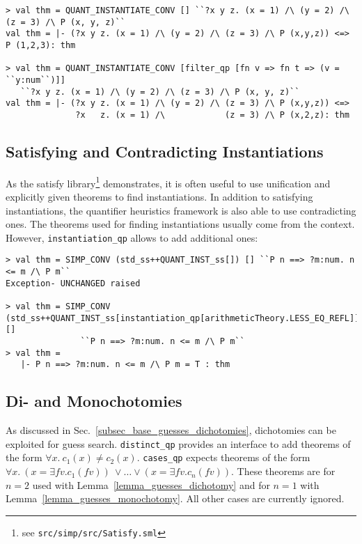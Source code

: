 \documentclass[a4paper,12pt,DIV=12,oneside]{scrbook}
\newcommand{\fv}{\textit{fv}}
\theoremstyle{definition}
\theoremstyle{remark}
\begin{document}
{\scriptsize
\begin{verbatim}
> val thm = QUANT_INSTANTIATE_CONV [] ``?x y z. (x = 1) /\ (y = 2) /\ (z = 3) /\ P (x, y, z)``
val thm = |- (?x y z. (x = 1) /\ (y = 2) /\ (z = 3) /\ P (x,y,z)) <=> P (1,2,3): thm

> val thm = QUANT_INSTANTIATE_CONV [filter_qp [fn v => fn t => (v = ``y:num``)]]
   ``?x y z. (x = 1) /\ (y = 2) /\ (z = 3) /\ P (x, y, z)``
val thm = |- (?x y z. (x = 1) /\ (y = 2) /\ (z = 3) /\ P (x,y,z)) <=>
              ?x   z. (x = 1) /\            (z = 3) /\ P (x,2,z): thm
\end{verbatim}}

\subsection{Satisfying and Contradicting Instantiations}

As the satisfy library\footnote{see \texttt{src/simp/src/Satisfy.sml}} demonstrates, it is often
useful to use unification and explicitly given theorems to
find instantiations. In addition to satisfying instantiations, the quantifier heuristics framework
is also able to use contradicting ones. The theorems used for finding instantiations usually come from
the context. However, \texttt{instantiation\_qp} allows to add additional ones:

{\scriptsize
\begin{verbatim}
> val thm = SIMP_CONV (std_ss++QUANT_INST_ss[]) [] ``P n ==> ?m:num. n <= m /\ P m``
Exception- UNCHANGED raised

> val thm = SIMP_CONV (std_ss++QUANT_INST_ss[instantiation_qp[arithmeticTheory.LESS_EQ_REFL]]) []
               ``P n ==> ?m:num. n <= m /\ P m``
> val thm =
   |- P n ==> ?m:num. n <= m /\ P m = T : thm
\end{verbatim}}

\subsection{Di- and Monochotomies}

As discussed in Sec.~\ref{subsec_base_guesses_dichotomies}, dichotomies can be exploited for guess search.
\texttt{distinct\_qp} provides an interface to add theorems
of the form $\forall x.\ c_1(x) \neq c_2(x)$.
\texttt{cases\_qp} expects theorems of the form
$\forall x. \ (x = \exists \fv. c_1(\fv))\ \vee \ldots \vee (x = \exists \fv. c_n(\fv))$.
These theorems are for $n = 2$ used with Lemma~\ref{lemma_guesses_dichotomy} and
for $n=1$ with Lemma~\ref{lemma_guesses_monochotomy}. All other cases are currently ignored.
\end{document}
